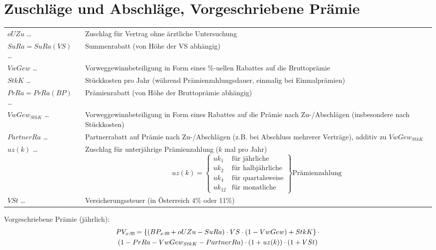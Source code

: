 \documentclass[a4paper,10pt]{article}
\makeatletter
\newcommand{\xn}{{\act[x]{n}}}
\DeclareRobustCommand{\act}[2][]{%
\def\arraystretch{0}%
\setlength\arraycolsep{0.5pt}%
\setlength\arrayrulewidth{0.5pt}%
\setbox0=\hbox{$\scriptstyle#1\ifx#1\empty{asdf}\else:\fi#2$}%
\begin{array}[b]{*2{@{}>{\scriptstyle}c}|}
\cline{2-2}%
\rule[1.25pt]{0pt}{\ht0}%
#1\ifx#1\empty\else:\fi & #2%
\end{array}%
}
\makeatother
\begin{document}
\section{Zuschläge und Abschläge, Vorgeschriebene Prämie}

\begin{longtable}{p{4cm}p{11cm}}
 $oUZu$ \dots & Zuschlag für Vertrag ohne ärztliche Untersuchung\\
 $SuRa=SuRa(VS)$ \dots & Summenrabatt (von Höhe der VS abhängig)\\
 $VwGew$ \dots & Vorweggewinnbeteiligung in Form eines \%-uellen Rabattes auf die Bruttoprämie\\
 $StkK$ \dots & Stückkosten pro Jahr (während Prämienzahlungsdauer, einmalig bei Einmalprämien)\\
 $PrRa=PrRa(BP)$ \dots & Prämienrabatt (von Höhe der Bruttoprämie abhängig)\\
 $VwGew_{StkK}$ \dots & Vorweggewinnbeteiligung in Form eines Rabattes auf die Prämie nach Zu-/Abschlägen (insbesondere nach Stückkosten)\\
 $PartnerRa$ \dots & Partnerrabatt auf Prämie nach Zu-/Abschlägen (z.B. bei Abschluss mehrerer Verträge), additiv zu $VwGew_{StkK}$\\
 
 $uz(k)$ \dots & Zuschlag für unterjährige Prämienzahlung ($k$ mal pro Jahr)
 \begin{equation*}
  uz(k)=\left.\begin{cases}uk_1 & \text {für jährliche}\\uk_2 & \text {für halbjährliche} \\ uk_4 & \text{für quartalsweise}\\uk_{12} & \text{für monatliche}\end{cases}\right\} \text{Prämienzahlung}
 \end{equation*}\\
 
 
 $VSt$ \dots & Versicherungssteuer (in Österreich 4\% oder 11\%) \\

\end{longtable}


Vorgeschriebene Prämie (jährlich):
\begin{multline*}
PV_\xn = \left\{ (BP_\xn + oUZu - SuRa) \cdot VS \cdot (1-VwGew) + StkK\right\} \cdot \\ \left(1-PrRa-VwGew_{StkK}-PartnerRa\right)\cdot \left(1+uz(k)\right) \cdot (1+VSt)
% 
\end{multline*}
\end{document}
